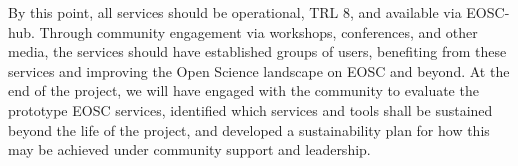 \begin{milestones}
  {
  By this point, all \TheProject services should be operational, TRL 8, and available via EOSC-hub.
  Through community engagement via workshops, conferences, and other media,
  the services should have established groups of users,
  benefiting from these services and improving the Open Science landscape
  on EOSC and beyond.
  At the end of the project,
  we will have engaged with the community to evaluate
  the prototype EOSC services,
  identified which services and tools shall be sustained beyond the life of the project,
  and developed a sustainability plan for
  how this may be achieved under community support and leadership.
  }

\end{milestones}

